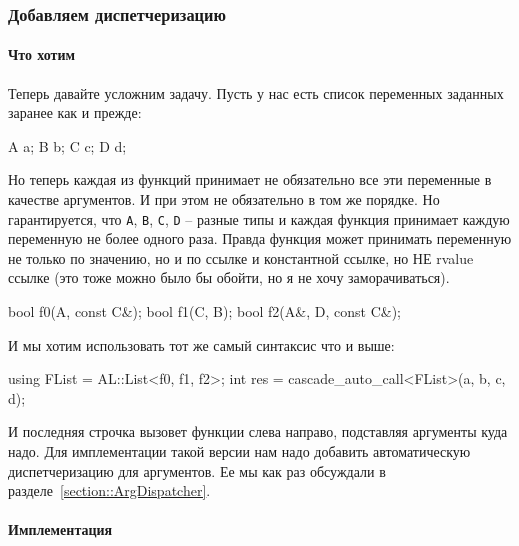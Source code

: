\subsubsection{Добавляем диспетчеризацию}

\paragraph{Что хотим}

Теперь давайте усложним задачу.
Пусть у нас есть список переменных заданных заранее как и прежде:
\begin{cppcode}[\nonumbers]
A a; B b; C c; D d;
\end{cppcode}
Но теперь каждая из функций принимает не обязательно все эти переменные в качестве аргументов.
И при этом не обязательно в том же порядке.
Но гарантируется, что \verb"A", \verb"B", \verb"C", \verb"D" -- разные типы и каждая функция принимает каждую переменную не более одного раза.
Правда функция может принимать переменную не только по значению, но и по ссылке и константной ссылке, но НЕ rvalue ссылке (это тоже можно было бы обойти, но я не хочу заморачиваться).
\begin{cppcode}[\nonumbers]
bool f0(A, const C&);
bool f1(C, B);
bool f2(A&, D, const C&);
\end{cppcode}
И мы хотим использовать тот же самый синтаксис что и выше:
\begin{cppcode}[\nonumbers]
using FList = AL::List<f0, f1, f2>;
int res = cascade_auto_call<FList>(a, b, c, d);
\end{cppcode}
И последняя строчка вызовет функции слева направо, подставляя аргументы куда надо.
Для имплементации такой версии нам надо добавить автоматическую диспетчеризацию для аргументов.
Ее мы как раз обсуждали в разделе~\ref{section::ArgDispatcher}.

\paragraph{Имплементация}

